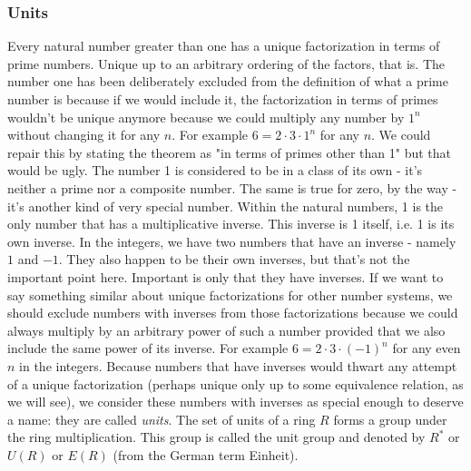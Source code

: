 \subsubsection{Units}
Every natural number greater than one has a unique factorization in terms of prime numbers. Unique up to an arbitrary ordering of the factors, that is. The number one has been deliberately excluded from the definition of what a prime number is because if we would include it, the factorization in terms of primes wouldn't be unique anymore because we could multiply any number by $1^n$ without changing it for any $n$. For example $6 = 2 \cdot 3 \cdot 1^n$ for any $n$. We could repair this by stating the theorem as "in terms of primes other than 1" but that would be ugly. The number 1 is considered to be in a class of its own - it's neither a prime nor a composite number. The same is true for zero, by the way - it's another kind of very special number. Within the natural numbers, 1 is the only number that has a multiplicative inverse. This inverse is 1 itself, i.e. 1 is its own inverse. In the integers, we have two numbers that have an inverse - namely $1$ and $-1$. They also happen to be their own inverses, but that's not the important point here. Important is only that they have inverses. If we want to say something similar about unique factorizations for other number systems, we should exclude numbers with inverses from those factorizations because we could always multiply by an arbitrary power of such a number provided that we also include the same power of its inverse. For example $6 = 2 \cdot 3 \cdot (-1)^n$ for any even $n$ in the integers. Because numbers that have inverses would thwart any attempt of a unique factorization (perhaps unique only up to some equivalence relation, as we will see), we consider these numbers with inverses as special enough to deserve a name: they are called \emph{units}. The set of units of a ring $R$ forms a group under the ring multiplication. This group is called the unit group and denoted by $R^*$ or $U(R)$ or $E(R)$ (from the German term Einheit).


